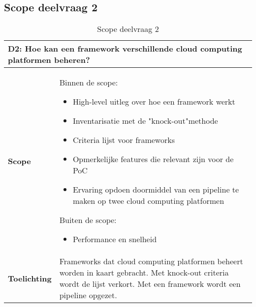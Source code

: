 \subsection*{Scope deelvraag 2}\label{appendix:scope-subquestion-2}
\begin{table}[hbt!]
  \centering
  \begin{tabular}{|p{.215\linewidth}|p{.72\linewidth}|}
  \hline
  \multicolumn{2}{|p{.97\linewidth}|}{\textbf{D2: Hoe kan een framework verschillende cloud computing platformen beheren?}} \\ \hline
    \textbf{Scope}&
      Binnen de scope:
      \begin{itemize}
        \item High-level uitleg over hoe een framework werkt
        \item Inventarisatie met de "knock-out"\space methode
        \item Criteria lijst voor frameworks
        \item Opmerkelijke features die relevant zijn voor de PoC
        \item Ervaring opdoen doormiddel van een pipeline te maken op twee cloud computing platformen
      \end{itemize}
      Buiten de scope:
      \begin{itemize}
        \item Performance en snelheid
      \end{itemize}
    \\ \hline
    \textbf{Toelichting}&
      Frameworks dat cloud computing platformen beheert worden in kaart gebracht. Met knock-out criteria wordt de lijst verkort. Met een framework wordt een pipeline opgezet.
    \\ \hline
  \end{tabular}
  \caption{Scope deelvraag 2}
  \label{table:scope-subquestion-2}
  \end{table}

